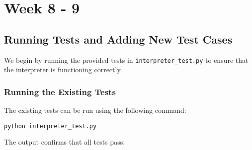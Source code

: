 \section{Week 8 - 9}

\subsection{Running Tests and Adding New Test Cases}

We begin by running the provided tests in \texttt{interpreter\_test.py} to ensure that the interpreter is functioning correctly.

\subsubsection{Running the Existing Tests}

The existing tests can be run using the following command:

\begin{verbatim}
python interpreter_test.py
\end{verbatim}

The output confirms that all tests pass:

